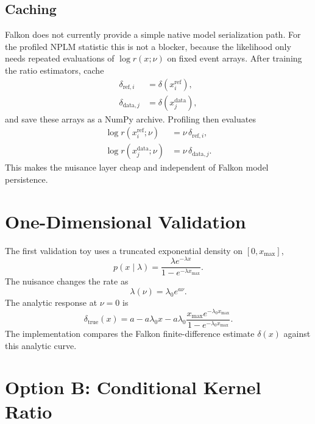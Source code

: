 \documentclass[11pt]{article}
\begin{document}
\subsection{Caching}

Falkon does not currently provide a simple native model serialization path.
For the profiled NPLM statistic this is not a blocker, because the likelihood
only needs repeated evaluations of $\log r(x;\nu)$ on fixed event arrays.
After training the ratio estimators, cache
\begin{align}
  \delta_{\mathrm{ref},i} &= \delta(x^{\mathrm{ref}}_i), \\
  \delta_{\mathrm{data},j} &= \delta(x^{\mathrm{data}}_j),
\end{align}
and save these arrays as a NumPy archive. Profiling then evaluates
\begin{align}
  \log r(x^{\mathrm{ref}}_i;\nu) &= \nu\,\delta_{\mathrm{ref},i}, \\
  \log r(x^{\mathrm{data}}_j;\nu) &= \nu\,\delta_{\mathrm{data},j}.
\end{align}
This makes the nuisance layer cheap and independent of Falkon model persistence.

\section{One-Dimensional Validation}

The first validation toy uses a truncated exponential density on $[0,x_{\max}]$,
\begin{equation}
  p(x\mid \lambda) =
  \frac{\lambda e^{-\lambda x}}
       {1-e^{-\lambda x_{\max}}}.
\end{equation}
The nuisance changes the rate as
\begin{equation}
  \lambda(\nu)=\lambda_0 e^{a\nu}.
\end{equation}
The analytic response at $\nu=0$ is
\begin{equation}
  \delta_{\mathrm{true}}(x)
  =
  a - a\lambda_0 x
  - a\lambda_0
    \frac{x_{\max} e^{-\lambda_0 x_{\max}}}
         {1-e^{-\lambda_0 x_{\max}}}.
\end{equation}
The implementation compares the Falkon finite-difference estimate
$\delta(x)$ against this analytic curve.

\section{Option B: Conditional Kernel Ratio}
\end{document}
